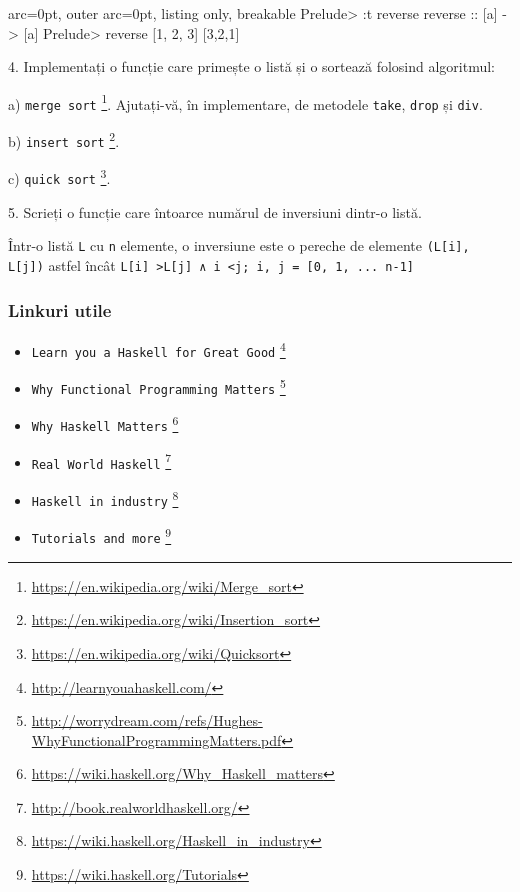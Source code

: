 \begin{tcblisting}{ arc=0pt, outer arc=0pt, listing only, breakable}
Prelude> :t reverse
reverse :: [a] -> [a]
Prelude> reverse [1, 2, 3]
[3,2,1]

\end{tcblisting}



4. Implementați o funcție care primește o listă și o sortează folosind algoritmul:

a) \texttt{merge sort} \footnote{\url{https://en.wikipedia.org/wiki/Merge\_sort}}. Ajutați-vă, în implementare, de metodele \texttt{take}, \texttt{drop} și \texttt{div}.

b) \texttt{insert sort} \footnote{\url{https://en.wikipedia.org/wiki/Insertion\_sort}}.

c) \texttt{quick sort} \footnote{\url{https://en.wikipedia.org/wiki/Quicksort}}.


5. Scrieți o funcție care întoarce numărul de inversiuni dintr-o listă.

\begin{tcolorbox}[colback=cyan!5, colframe=cyan!10, breakable]
Într-o listă \texttt{L} cu \texttt{n} elemente, o inversiune este o pereche de elemente \texttt{(L[i], L[j])} astfel încât \texttt{L[i] \textgreater  L[j] ∧ i \textless  j;   i, j = [0, 1, ... n-1]}
\end{tcolorbox}

\subsubsection*{ Linkuri utile }
\begin{itemize}
	\item  \texttt{Learn you a Haskell for Great Good} \footnote{\url{http://learnyouahaskell.com/}}
	\item  \texttt{Why Functional Programming Matters} \footnote{\url{http://worrydream.com/refs/Hughes-WhyFunctionalProgrammingMatters.pdf}}
	\item  \texttt{Why Haskell Matters} \footnote{\url{https://wiki.haskell.org/Why\_Haskell\_matters}}
	\item  \texttt{Real World Haskell} \footnote{\url{http://book.realworldhaskell.org/}}
	\item  \texttt{Haskell in industry} \footnote{\url{https://wiki.haskell.org/Haskell\_in\_industry}}
	\item  \texttt{Tutorials and more} \footnote{\url{https://wiki.haskell.org/Tutorials}}
\end{itemize}
